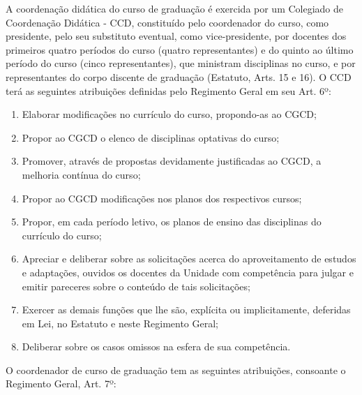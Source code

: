 \documentclass[
	12pt,				%
	openright,			%
  oneside,     %
	a4paper,			%
 hyphens,
	chapter=TITLE,		%
	english,			%
	french,				%
	spanish,			%
	brazil				%
	]{abntex2}
\begin{document}
A coordenação didática do curso de graduação é exercida por um Colegiado de Coordenação Didática - CCD, constituído pelo coordenador do curso, como presidente, pelo seu substituto eventual, como vice-presidente, por docentes dos primeiros quatro períodos do curso (quatro representantes) e do quinto ao último período do curso (cinco representantes), que ministram disciplinas no curso, e por representantes do corpo discente de graduação (Estatuto, Arts. 15 e 16). O CCD terá as seguintes atribuições definidas pelo Regimento Geral em seu Art. 6º:

\begin{enumerate}
  \item Elaborar modificações no currículo do curso, propondo-as ao CGCD;
  \item Propor ao CGCD o elenco de disciplinas optativas do curso;
  \item Promover, através de propostas devidamente justificadas ao CGCD, a melhoria contínua do curso;
  \item Propor ao CGCD modificações nos planos dos respectivos cursos;
  \item Propor, em cada período letivo, os planos de ensino das disciplinas do currículo do curso;
  \item Apreciar e deliberar sobre as solicitações acerca do aproveitamento de estudos e adaptações, ouvidos os docentes da Unidade com competência para julgar e emitir pareceres sobre o conteúdo de tais solicitações;
  \item Exercer as demais funções que lhe são, explícita ou implicitamente, deferidas em Lei, no Estatuto e neste Regimento Geral;
  \item Deliberar sobre os casos omissos na esfera de sua competência.
\end{enumerate}

O coordenador de curso de graduação tem as seguintes atribuições, consoante o Regimento Geral, Art. 7º:
\end{document}
